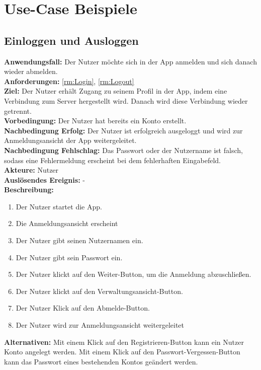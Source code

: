 \documentclass[parskip=full]{scrartcl}
\newcommand{\changelocaltocdepth}[1]{%
  \addtocontents{toc}{\protect\setcounter{tocdepth}{#1}}%
  \setcounter{tocdepth}{#1}%
}
\newcommand{\enablesubsectionnumbering}[1]{
    \renewcommand{\thesubsection}{$\langle$#1\arabic{subsection}0$\rangle$}
    \changelocaltocdepth{1} 
}
\begin{document}
\section{Use-Case Beispiele}

\enablesubsectionnumbering{F}
\subsection{Einloggen und Ausloggen}
\textbf{Anwendungsfall:} Der Nutzer möchte sich in der App anmelden und sich danach wieder abmelden.\\
\textbf{Anforderungen:} \ref{rm:Login}, \ref{rm:Logout}\\
\textbf{Ziel:} Der Nutzer erhält Zugang zu seinem Profil in der App, indem eine Verbindung zum Server hergestellt wird. Danach wird diese Verbindung wieder getrennt.\\
\textbf{Vorbedingung:} Der Nutzer hat bereits ein Konto erstellt.\\
\textbf{Nachbedingung Erfolg:} Der Nutzer ist erfolgreich ausgeloggt und wird zur Anmeldungsansicht der App weitergeleitet.\\
\textbf{Nachbedingung Fehlschlag:} Das Passwort oder der Nutzername ist falsch, sodass eine Fehlermeldung erscheint bei dem fehlerhaften Eingabefeld.\\
\textbf{Akteure:} Nutzer\\
\textbf{Auslösendes Ereignis:} -\\
\textbf{Beschreibung:}
\begin{enumerate}
    \item Der Nutzer startet die App.
    \item Die Anmeldungsansicht erscheint
    \item Der Nutzer gibt seinen Nutzernamen ein.
    \item Der Nutzer gibt sein Passwort ein.
    \item Der Nutzer klickt auf den Weiter-Button, um die Anmeldung abzuschließen.
    \item Der Nutzer klickt auf den Verwaltungsansicht-Button.
    \item Der Nutzer Klick auf den Abmelde-Button.
    \item Der Nutzer wird zur Anmeldungsansicht weitergeleitet
\end{enumerate}
\textbf{Alternativen:} Mit einem Klick auf den Registrieren-Button kann ein Nutzer Konto angelegt werden. Mit einem Klick auf den Passwort-Vergessen-Button kann das Passwort eines bestehenden Kontos geändert werden.
\newpage
\end{document}
